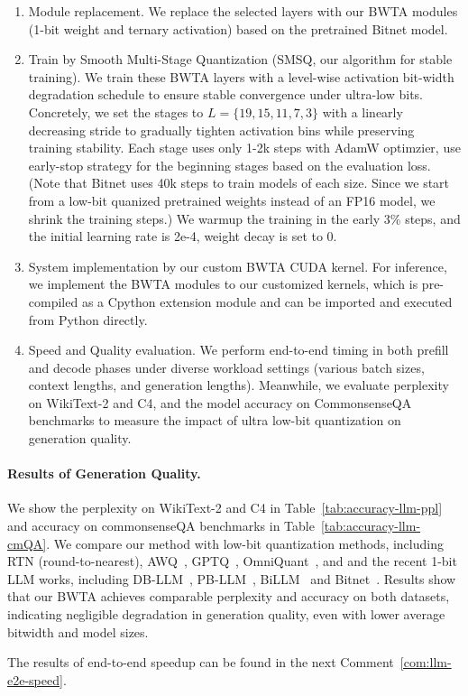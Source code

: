 \begin{revresponse}[]
\begin{enumerate}[label={Step \arabic* }, leftmargin=*]
    \item {Module replacement.} We replace the selected layers with our BWTA modules (1-bit weight and ternary activation) based on the pretrained Bitnet model. 

    \item {Train by Smooth Multi-Stage Quantization (SMSQ, our algorithm for stable training)}. We train these BWTA layers with a level-wise activation bit-width degradation schedule to ensure stable convergence under ultra-low bits. Concretely, we set the stages to $L=\{19,15,11,7,3\}$ with a linearly decreasing stride to gradually tighten activation bins while preserving training stability. Each stage uses only 1-2k steps with AdamW optimzier, use early-stop strategy for the beginning stages based on the evaluation loss. (Note that Bitnet uses 40k steps to train models of each size. Since we start from a low-bit quanized pretrained weights instead of an FP16 model, we shrink the training steps.) We warmup the training in the early 3\% steps, and the initial learning rate is 2e-4,  weight decay is set to 0. 

    \item {System implementation by our custom BWTA CUDA kernel}. For inference, we implement the BWTA modules to our customized kernels, which is pre-compiled as a Cpython extension module and can be imported and executed from Python directly.
    
    \item {Speed and Quality evaluation.} We perform end-to-end timing in both prefill and decode phases under diverse workload settings (various batch sizes, context lengths, and generation lengths). Meanwhile, we evaluate perplexity on WikiText-2 and C4, and the model accuracy on CommonsenseQA benchmarks to measure the impact of ultra low-bit quantization on generation quality. 
\end{enumerate}


\paragraph{Results of Generation Quality.} 
We show the perplexity on WikiText-2 and C4 in Table~\ref{tab:accuracy-llm-ppl} and accuracy on commonsenseQA benchmarks in Table~\ref{tab:accuracy-llm-cmQA}. We compare our method with low-bit quantization methods, including RTN (round-to-nearest), AWQ~\cite{lin2024awq}, GPTQ~\cite{gptq}, OmniQuant~\cite{shao2023omniquant}, and  and the recent 1-bit LLM works, including DB-LLM~\cite{chen2024dbllm}, PB-LLM~\cite{shang2023pbllm}, BiLLM~\cite{huang2024billm} and Bitnet~\cite{wang2023bitnet}. 
Results show that our BWTA achieves comparable perplexity and accuracy on both datasets, indicating negligible degradation in generation quality, even with lower average bitwidth and model sizes. 

The results of end-to-end speedup can be found in the next Comment~\ref{com:llm-e2e-speed}. 

\end{revresponse}


